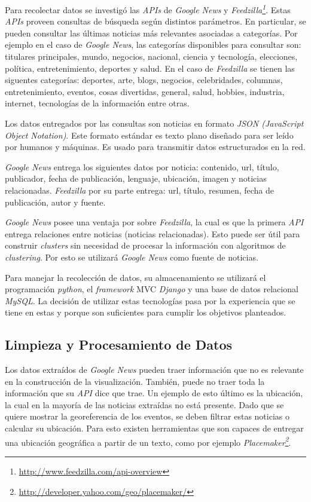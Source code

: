 \documentclass[10pt]{article}
\begin{document}
	Para recolectar datos se investigó las \emph{APIs} de \emph{Google News} y \emph{Feedzilla\footnote{\url{http://www.feedzilla.com/api-overview}}}. Estas \emph{APIs} proveen consultas de búsqueda según distintos parámetros. En particular, se pueden consultar las últimas noticias más relevantes asociadas a categorías. Por ejemplo en el caso de \emph{Google News}, las categorías disponibles para consultar son: titulares principales, mundo, negocios, nacional, ciencia y tecnología, elecciones, política, entretenimiento, deportes y salud. En el caso de \emph{Feedzilla} se tienen las siguentes categorías: deportes, arte, blogs, negocios, celebridades, columnas, entretenimiento, eventos, cosas divertidas, general, salud, hobbies, industria, internet, tecnologías de la información entre otras.
	
	Los datos entregados por las consultas son noticias en formato \emph{JSON (JavaScript Object Notation)}. Este formato estándar es texto plano diseñado para ser leído por humanos y máquinas. Es usado para transmitir datos estructurados en la red.
	
	\emph{Google News} entrega los siguientes datos por noticia: contenido, url, título, publicador, fecha de publicación, lenguaje, ubicación, imagen y noticias relacionadas. \emph{Feedzilla} por su parte entrega: url, título, resumen, fecha de publicación, autor y fuente.
	
	\emph{Google News} posee una ventaja por sobre \emph{Feedzilla}, la cual es que la primera \emph{API} entrega relaciones entre noticias (noticias relacionadas). Esto puede ser útil para construir \emph{clusters} sin necesidad de procesar la información con algoritmos de \emph{clustering}. Por esto se utilizará \emph{Google News} como fuente de noticias.
	
	Para manejar la recolección de datos, su almacenamiento se utilizará el programación \emph{python}, el \emph{framework} MVC \emph{Django} y una base de datos relacional \emph{MySQL}. La decisión de utilizar estas tecnologías pasa por la experiencia que se tiene en estas y porque son suficientes para cumplir los objetivos planteados.
	
\subsection{Limpieza y Procesamiento de Datos}
	Los datos extraídos de \emph{Google News} pueden traer información que no es relevante en la construcción de la visualización. También, puede no traer toda la información que su \emph{API} dice que trae. Un ejemplo de esto último es la ubicación, la cual en la mayoría de las noticias extraídas no está presente. Dado que se quiere mostrar la georeferencia de los eventos, se deben filtrar estas noticias o calcular su ubicación. Para esto existen herramientas que son capaces de entregar una ubicación geográfica a partir de un texto, como por ejemplo \emph{Placemaker\footnote{\url{http://developer.yahoo.com/geo/placemaker/}}}.
	
\end{document}
